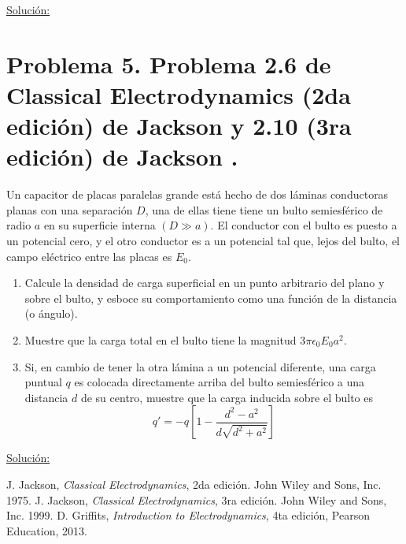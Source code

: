 \documentclass[a4paper,10pt]{article}
\numberwithin{equation}{section}
\begin{document}
\vspace{.3cm}

\underline{Solución:} \vspace{.3cm}

\section{Problema 5. Problema 2.6 de Classical Electrodynamics (2da edición) de Jackson 
\cite{jackson2} y 2.10 (3ra edición) de Jackson \cite{jackson3}.}

Un capacitor de placas paralelas grande está hecho de dos láminas conductoras 
planas con una separación $D$, una de ellas tiene tiene un bulto semiesférico 
de radio $a$ en su superficie interna $(D \gg a)$. El conductor con el bulto 
es puesto a un potencial cero, y el otro conductor es a un potencial tal que, 
lejos del bulto, el campo eléctrico entre las placas es $E_0$.

\begin{enumerate}[label=\textbf{(\alph*)}]
 \item Calcule la densidad de carga superficial en un punto arbitrario del 
 plano y sobre el bulto, y esboce su comportamiento como una función de la distancia 
 (o ángulo).
 \item Muestre que la carga total en el bulto tiene la magnitud $3\pi\epsilon_0E_0a^2$.
 \item Si, en cambio de tener la otra lámina a un potencial diferente, una carga 
 puntual $q$ es colocada directamente arriba del bulto semiesférico a una distancia 
 $d$ de su centro, muestre que la carga inducida sobre el bulto es 
 $$
 q' = -q\left[1 - \frac{d^2 - a^2}{d\sqrt{d^2 + a^2}} \right]
 $$
\end{enumerate}

\vspace{.3cm}

\underline{Solución:} \vspace{.3cm}

\begin{thebibliography}{10}
J. Jackson, \emph{Classical Electrodynamics}, 2da edición. John Wiley and Sons, Inc. 
1975.
J. Jackson, \emph{Classical Electrodynamics}, 3ra edición. John Wiley and Sons, Inc. 
1999.
D. Griffits, \emph{Introduction to Electrodynamics}, 4ta edición, Pearson Education, 
2013.
\end{thebibliography}
\end{document}
